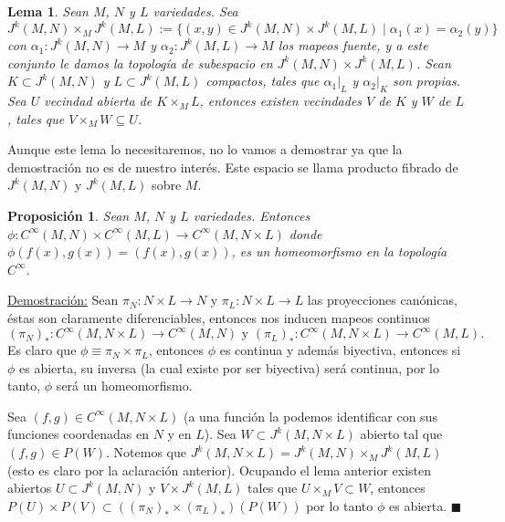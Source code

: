 \documentclass{report}
\newtheorem{prop}[theorem]{Proposici\'on}
\newtheorem{lem}[theorem]{Lema}
\theoremstyle{definition}
\begin{document}
\begin{lem}
Sean $M$, $N$ y $L$ variedades. Sea $$J^k (M,N) \times_M J^k (M,L) := \{  (x,y) \in J^k (M,N) \times J^k (M,L) \mid \alpha_1 (x) = \alpha_2 (y) \}$$
con $\alpha_1: J^k (M,N) \to M$ y $\alpha_2: J^k(M,L) \to M$ los mapeos fuente, y a este conjunto le damos la topolog\'ia de subespacio en $J^k (M,N) \times J^k (M,L)$. Sean $K \subset J^k (M,N)$ y $L \subset J^k (M,L)$ compactos, tales que $\alpha_1 \vert_L$ y $\alpha_2 \vert_K$ son propias. Sea $U $ vecindad abierta de $K \times_M L$, entonces existen vecindades $V$ de $K$ y $W$ de $L$, tales que $V \times_M W \subseteq U$.
\end{lem}

Aunque este lema lo necesitaremos, no lo vamos a demostrar ya que la demostraci\'on no es de nuestro inter\'es. Este espacio se llama producto fibrado de $J^k (M,N)$ y $J^k (M,L)$ sobre $M$.

\begin{prop}
Sean $M$, $N$ y $L$ variedades. Entonces $\phi: C^\infty (M,N) \times C^\infty (M,L) \to C^\infty (M, N \times L)$ donde $\phi (f(x), g(x)) = (f(x), g(x))$, es un homeomorfismo en la topolog\'ia $C^\infty$.

\end{prop}

\underline{Demostraci\'on:} Sean $\pi_N: N \times L \to N$ y $\pi_L: N \times L \to L$ las proyecciones can\'onicas, \'estas son claramente diferenciables, entonces nos inducen mapeos continuos $$(\pi_N)_\ast : C^\infty (M , N \times L ) \to C^\infty (M, N) \text{ y }(\pi_L)_\ast :C^\infty (M, N \times L) \to C^\infty (M ,L).$$
Es claro que $\phi \equiv \pi_N \times \pi_L$, entonces $\phi$ es continua y adem\'as biyectiva, entonces si $\phi$ es abierta, su inversa (la cual existe por ser biyectiva) ser\'a continua, por lo tanto, $\phi$ ser\'a un homeomorfismo.

Sea $(f,g) \in C^\infty (M, N \times L ) $ (a una funci\'on la podemos identificar con sus funciones coordenadas en $N$ y en $L$). Sea $W \subset J^k (M, N \times L )$ abierto tal que $(f,g ) \in P(W)$. Notemos que $J^k (M, N \times L ) = J^k (M, N) \times_M J^k (M, L)$ (esto es claro por la aclaraci\'on anterior). Ocupando el lema anterior existen abiertos $U \subset J^k (M,N)$ y $V \times J^k(M,L)$ tales que $U \times_M V \subset W$, entonces $P(U) \times P(V) \subset ( (\pi_N)_\ast \times (\pi_L)_\ast )(P(W))$ por lo tanto $\phi$ es abierta. $\blacksquare$
\end{document}
